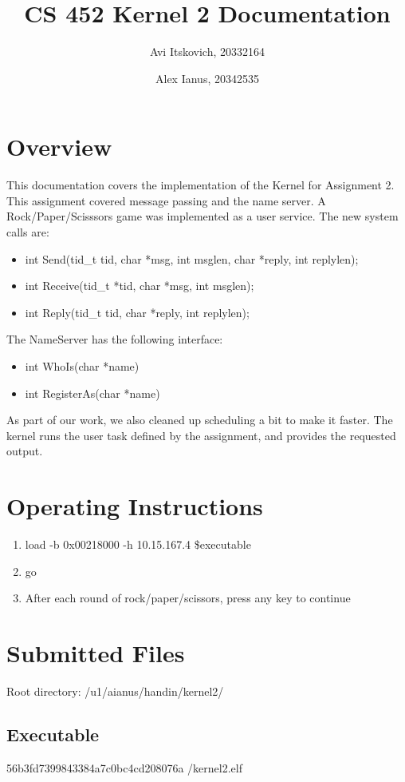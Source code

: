 \documentclass{article}
\title{CS 452 Kernel 2 Documentation}
\author{
  Avi Itskovich, 20332164
  \and
  Alex Ianus, 20342535
}
\begin{document}
\maketitle

\section{Overview}

This documentation covers the implementation of the Kernel for Assignment 2. This assignment covered message passing and the name server. A Rock/Paper/Scisssors game was implemented as a user service. The new system calls are: 
\begin{itemize}
  \item int Send(tid\_t tid, char *msg, int msglen, char *reply, int replylen);
  \item int Receive(tid\_t *tid, char *msg, int msglen);
  \item int Reply(tid\_t tid, char *reply, int replylen);
\end{itemize}
The NameServer has the following interface:
\begin{itemize}
  \item int WhoIs(char *name)
  \item int RegisterAs(char *name)
\end{itemize}
As part of our work, we also cleaned up scheduling a bit to make it faster. The kernel runs the user task defined by the assignment, and provides the requested output.

\section{Operating Instructions}
\begin{enumerate}
  \item load -b 0x00218000 -h 10.15.167.4 \$executable
  \item go
  \item After each round of rock/paper/scissors, press any key to continue
\end{enumerate}

\section{Submitted Files}
Root directory: /u1/aianus/handin/kernel2/

\subsection{Executable}
56b3fd7399843384a7c0bc4cd208076a  /kernel2.elf
\end{document}
